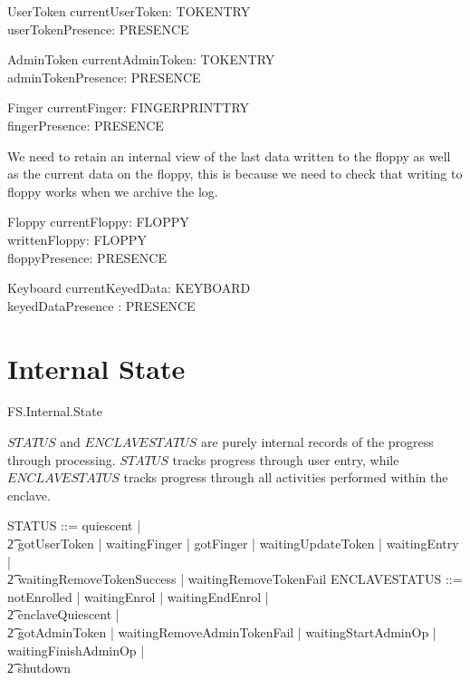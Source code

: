 \begin{schema}{UserToken}
	currentUserToken: TOKENTRY
\\	userTokenPresence: PRESENCE
\end{schema}

\begin{schema}{AdminToken}
	currentAdminToken: TOKENTRY
\\	adminTokenPresence: PRESENCE
\end{schema}

\begin{schema}{Finger}
	currentFinger: FINGERPRINTTRY
\\	fingerPresence: PRESENCE
\end{schema}

We need to retain an internal view of the last data written to the
floppy as well as the current data on the floppy, this is because we
need to check that writing to floppy works when we archive the log.
\begin{schema}{Floppy}
	currentFloppy: FLOPPY
\\      writtenFloppy: FLOPPY
\\	floppyPresence: PRESENCE
\end{schema}

\begin{schema}{Keyboard}
        currentKeyedData: KEYBOARD
\\      keyedDataPresence : PRESENCE
\end{schema}  

\section{Internal State}

\begin{traceunit}{FS.Internal.State}
\end{traceunit}


$STATUS$ and $ENCLAVESTATUS$ are purely internal records of the progress through 
processing. $STATUS$ tracks progress through user entry, while
$ENCLAVESTATUS$ tracks progress through all activities performed
within the enclave. 

\begin{zed}
	STATUS ::= quiescent | 
\\ \t2          gotUserToken |  waitingFinger | gotFinger | waitingUpdateToken | waitingEntry |
\\ \t2          waitingRemoveTokenSuccess | waitingRemoveTokenFail 
\also
        ENCLAVESTATUS ::= notEnrolled | waitingEnrol | waitingEndEnrol |
\\ \t2          enclaveQuiescent |
\\ \t2          gotAdminToken | waitingRemoveAdminTokenFail |
waitingStartAdminOp | waitingFinishAdminOp |
\\ \t2          shutdown 
\end{zed}

